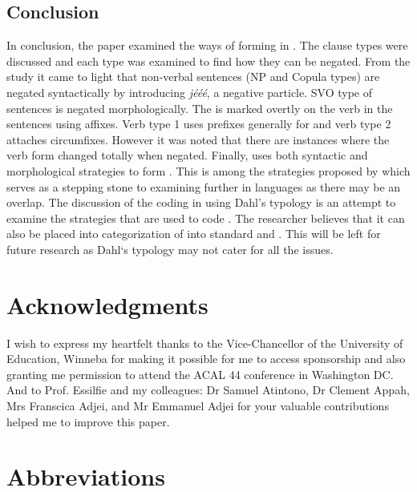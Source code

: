 \documentclass[output=paper,newtxmath,modfonts,nonflat,hidelinks]{langsci/langscibook}
\begin{document}
\subsection{\label{sec:ollennu:3.1} Conclusion}

In conclusion, the paper examined the ways of forming  in . The clause types were discussed and each type was examined to find how they can be negated. From the study it came to light that non-verbal sentences (NP and Copula types) are negated syntactically by introducing \textit{jééé}, a {negative particle}. SVO type of sentences is negated morphologically. The  is marked overtly on the verb in the sentences using affixes. Verb type 1 uses prefixes generally for  and verb type 2 attaches circumfixes. However it was noted that there are instances where the verb form changed totally when negated. Finally,  uses both syntactic and morphological strategies to form . This is among the strategies proposed by \citet{dahl1979typology} which serves as a stepping stone to examining  further in  languages as there may be an overlap. The discussion of the  coding in  using Dahl’s typology is an attempt to examine the strategies that are used to code . The researcher believes that it can also be placed into \citet{Miestamo2007} categorization of  into standard and . This will be left for future research as Dahl‘s typology may not cater for all the issues.

\section*{Acknowledgments}
I wish to express my heartfelt thanks to the Vice-Chancellor of the University of Education, Winneba for making it possible for me to access sponsorship and also granting me permission to attend the ACAL 44 conference in Washington DC. And to Prof. Essilfie and my colleagues: Dr Samuel Atintono, Dr Clement Appah, Mrs Franscica Adjei, and Mr Emmanuel Adjei for your valuable contributions helped me to improve this paper.
 
\section*{Abbreviations}
\end{document}

